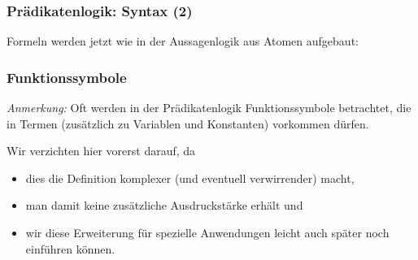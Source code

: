 \documentclass[aspectratio=1610,onlymath]{beamer}
\begin{document}
\begin{frame}\frametitle{Prädikatenlogik: Syntax (2)}

Formeln werden jetzt wie in der Aussagenlogik aus Atomen aufgebaut:


\end{frame}
\begin{frame}\frametitle{Funktionssymbole}

\emph{Anmerkung:} Oft werden in der Prädikatenlogik Funktionssymbole
betrachtet, die in Termen (zusätzlich zu Variablen und Konstanten)
vorkommen dürfen.
\bigskip

Wir verzichten hier vorerst darauf, da
\begin{itemize}
\item dies die Definition komplexer (und eventuell verwirrender) macht,
\item man damit keine zusätzliche Ausdruckstärke erhält und
\item wir diese Erweiterung für spezielle Anwendungen leicht auch später noch einführen können.
\end{itemize}

\end{frame}
\end{document}
